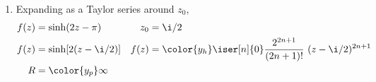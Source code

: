 \begin{enumerate}
    \item Expanding as a Taylor series around $ z_0 $,
          \begin{align}
              f(z) & = \sinh(2z - \pi)                                  &
              z_0  & = \i/2                                               \\
              f(z) & = \sinh[2(z - \i/2)]                               &
              f(z) & = \color{y_h} \iser[n]{0} \frac{2^{2n+1}}{(2n+1)!}
              \ (z - \i/2)^{2n+1}                                         \\
              R    & = \color{y_p} \infty
          \end{align}


\end{enumerate}